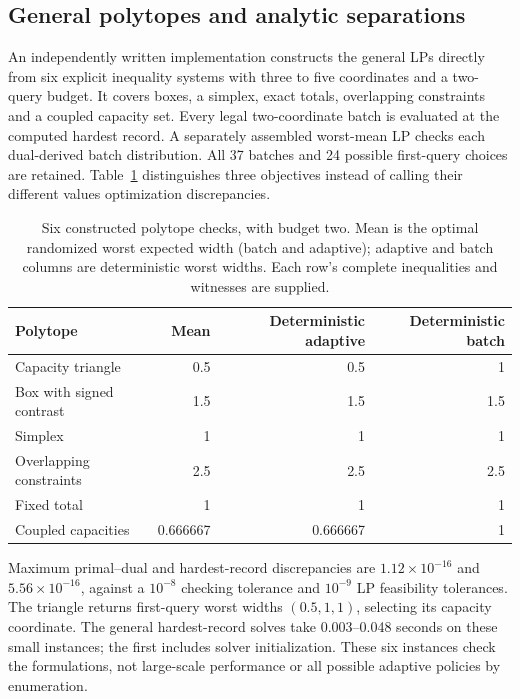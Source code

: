 \subsection{General polytopes and analytic separations}
An independently written implementation constructs the general LPs directly
from six explicit inequality systems with three to five coordinates and a
two-query budget. It covers boxes, a simplex, exact totals, overlapping
constraints and a coupled capacity set. Every legal two-coordinate batch
is evaluated at the computed hardest record. A separately assembled
worst-mean LP checks each dual-derived batch distribution. All 37 batches
and 24 possible first-query choices are retained. Table~\ref{tab:general-values}
distinguishes three objectives instead of calling their different values
optimization discrepancies.
\begin{table}[htbp]\centering\small
\caption{Six constructed polytope checks, with budget two. Mean is the
optimal randomized worst expected width (batch and adaptive); adaptive
and batch columns are deterministic worst widths. Each row's complete
inequalities and witnesses are supplied.}\label{tab:general-values}
\begin{tabular}{lrrr}\toprule
Polytope & Mean & Deterministic adaptive & Deterministic batch\\\midrule
Capacity triangle & 0.5 & 0.5 & 1\\
Box with signed contrast & 1.5 & 1.5 & 1.5\\
Simplex & 1 & 1 & 1\\
Overlapping constraints & 2.5 & 2.5 & 2.5\\
Fixed total & 1 & 1 & 1\\
Coupled capacities & 0.666667 & 0.666667 & 1\\
\bottomrule\end{tabular}\end{table}
\FloatBarrier
Maximum primal--dual and hardest-record discrepancies are
$1.12\times10^{-16}$ and $5.56\times10^{-16}$, against a $10^{-8}$
checking tolerance and $10^{-9}$ LP feasibility tolerances. The triangle
returns first-query worst widths $(0.5,1,1)$, selecting its capacity
coordinate. The general hardest-record solves take 0.003--0.048 seconds
on these small instances; the first includes solver initialization.
These six instances check the formulations, not large-scale performance
or all possible adaptive policies by enumeration.

